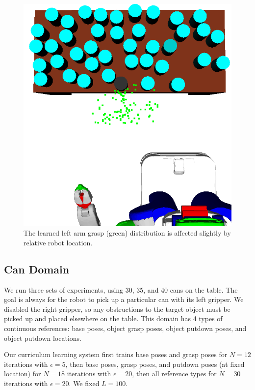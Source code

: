 \begin{figure}[t]
    \includegraphics[scale=0.15]{images/grasp_context_right.png}
  \caption{\small{The learned left arm grasp (green) distribution is affected slightly
by relative robot location.}}
  \label{fig:context}
\end{figure}

\subsection{Can Domain}
We run three sets of experiments, using 30, 35, and 40 cans on the table.
The goal is always for the robot to pick up a particular can with its
left gripper. We disabled the right gripper, so any obstructions to the target object must be picked up and
placed elsewhere on the table. This domain has 4 types of continuous references: base poses, object grasp
poses, object putdown poses, and object putdown locations.

Our curriculum learning system first trains base poses and grasp poses for $N = 12$ iterations with $\epsilon = 5$,
then base poses, grasp poses, and putdown poses (at fixed location) for $N = 18$ iterations with $\epsilon = 20$,
then all reference types for $N = 30$ iterations with $\epsilon = 20$. We fixed $L = 100$.

